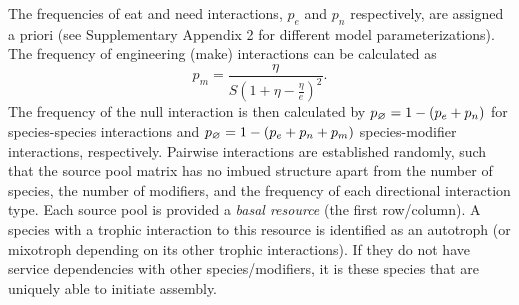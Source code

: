 \documentclass[twocolumn,preprintnumbers,amsmath,amssymb,superscriptaddress,linenumbers]{revtex4-1}
\newcommand{\rr}[1]{{\rm #1}}
\begin{document}
\begin{bibunit}
The frequencies of eat and need interactions, $p_e$ and $p_n$ respectively, are assigned a priori (see Supplementary Appendix 2 for different model parameterizations).
The frequency of engineering (make) interactions can be calculated as
\begin{equation}
p_m = \frac{\eta}{S\left(1 + \eta - \frac{\eta}{e}\right)^2}.
\end{equation}
The frequency of the null interaction is then calculated by $p_\rr{\varnothing} = 1 - (p_e + p_n)$ for species-species interactions and $p_\rr{\varnothing} = 1 - (p_e + p_n+ p_m)$ species-modifier interactions, respectively.
Pairwise interactions are established randomly, such that the source pool matrix has no imbued structure apart from the number of species, the number of modifiers, and the frequency of each directional interaction type.
Each source pool is provided a \emph{basal resource} (the first row/column).
A species with a trophic interaction to this resource is identified as an autotroph (or mixotroph depending on its other trophic interactions).
If they do not have service dependencies with other species/modifiers, it is these species that are uniquely able to initiate assembly.


\end{bibunit}
\end{document}
